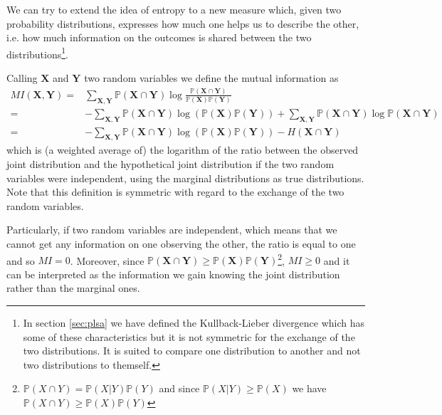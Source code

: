 \documentclass[11pt, a4paper, oneside, openright]{book}
\begin{document}
We can try to extend the idea of entropy to a new measure which, given two probability distributions, expresses how much one helps us to describe the other, i.e. how much information on the outcomes is shared between the two distributions\footnote{In section \ref{sec:plsa} we have defined the Kullback-Lieber divergence which has some of these characteristics but it is not symmetric for the exchange of the two distributions. It is suited to compare one distribution to another and not two distributions to themself.}.
 
Calling $\mathbf{X}$ and $\mathbf{Y}$ two random variables we define the mutual information as 
\begin{align*}
	MI(\mathbf{X},\mathbf{Y}) = &\sum_{\mathbf{X},\mathbf{Y}} \mathbb{P}(\mathbf{X}\cap\mathbf{Y})\log\frac{\mathbb{P}(\mathbf{X}\cap\mathbf{Y})}{\mathbb{P}(\mathbf{X})\mathbb{P}(\mathbf{Y})} \\
	= &-\sum_{\mathbf{X},\mathbf{Y}} \mathbb{P}(\mathbf{X}\cap\mathbf{Y})\log\left(\mathbb{P}(\mathbf{X})\mathbb{P}(\mathbf{Y})\right) + \sum_{\mathbf{X},\mathbf{Y}} \mathbb{P}(\mathbf{X}\cap\mathbf{Y})\log{\mathbb{P}(\mathbf{X}\cap\mathbf{Y})} \\
	= &-\sum_{\mathbf{X},\mathbf{Y}} \mathbb{P}(\mathbf{X}\cap\mathbf{Y})\log\left(\mathbb{P}(\mathbf{X})\mathbb{P}(\mathbf{Y})\right) - H(\mathbf{X} \cap \mathbf{Y})
\end{align*}
which is (a weighted average of) the logarithm of the ratio between the observed joint distribution and the hypothetical joint distribution if the two random variables were independent, using the marginal distributions as true distributions. Note that this definition is symmetric with regard to the exchange of the two random variables.

Particularly, if two random variables are independent, which means that we cannot get any information on one observing the other, the ratio is equal to one and so $MI=0$. Moreover, since $\mathbb{P}(\mathbf{X}\cap\mathbf{Y}) \geq \mathbb{P}(\mathbf{X})\mathbb{P}(\mathbf{Y})$\footnote{$\mathbb{P}(X \cap Y) = \mathbb{P}(X|Y)\mathbb{P}(Y)$ and since $\mathbb{P}(X|Y)\geq\mathbb{P}(X)$ we have $\mathbb{P}(X \cap Y)\geq\mathbb{P}(X)\mathbb{P}(Y)$}, $MI\geq0$ and it can be interpreted as the information we gain knowing the joint distribution rather than the marginal ones.
\end{document}

